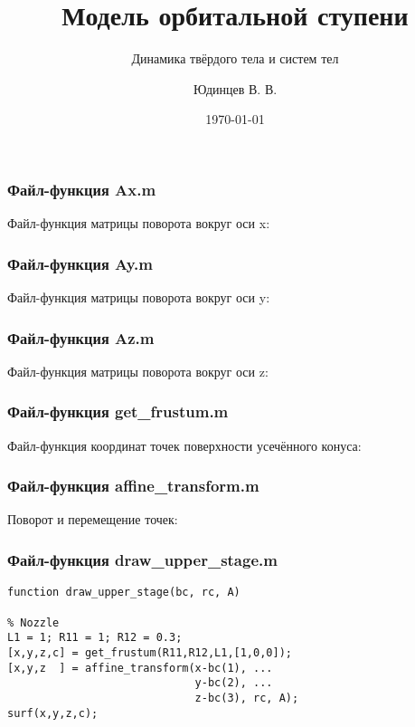 \documentclass[12pt, compress]{beamer}
\title[numpy]{Модель орбитальной ступени}
\subtitle{Динамика твёрдого тела и систем тел}
\author[Самарский университет]{Юдинцев В. В.}
\institute{Кафедра теоретической механики\\Самарский университет}
\date{\today}
\renewcommand{\emph}[1]{\textcolor{dark-blue}{#1}}
\begin{document}
{
\usebackgroundtemplate[background]{}
\begin{frame}[plain]
\maketitle
\end{frame}
}


\begin{frame}[c, fragile]
\frametitle{Файл-функция \emph{Ax.m}}
Файл-функция матрицы поворота вокруг оси \emph{x}:

\end{frame}

\begin{frame}[c, fragile]
\frametitle{Файл-функция \emph{Ay.m}}
Файл-функция матрицы поворота вокруг оси \emph{y}:

\end{frame}

\begin{frame}[c, fragile]
\frametitle{Файл-функция \emph{Az.m}}
Файл-функция матрицы поворота вокруг оси \emph{z}:

\end{frame}

\begin{frame}[c, fragile]
\frametitle{Файл-функция \emph{get\_frustum.m}}
Файл-функция координат точек поверхности усечённого конуса:

\end{frame}

\begin{frame}[c, fragile]
\frametitle{Файл-функция \emph{affine\_transform.m}}
Поворот и перемещение точек:

\end{frame}

\begin{frame}[c, fragile]
\frametitle{Файл-функция \emph{draw\_upper\_stage.m}}
\begin{lstlisting}
function draw_upper_stage(bc, rc, A)

% Nozzle 
L1 = 1; R11 = 1; R12 = 0.3;
[x,y,z,c] = get_frustum(R11,R12,L1,[1,0,0]);
[x,y,z  ] = affine_transform(x-bc(1), ...
                             y-bc(2), ...
                             z-bc(3), rc, A);
surf(x,y,z,c);
\end{lstlisting}
\end{frame}
\end{document}
